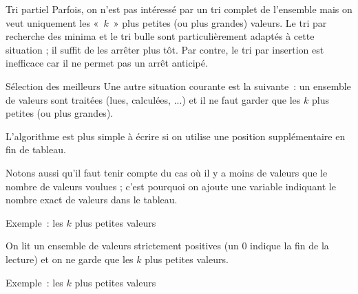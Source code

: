 \begin{frame}{Tri partiel}
	Parfois, on n’est pas intéressé par un tri complet de l’ensemble mais on
	veut uniquement les «~$k$~» plus petites (ou plus grandes) valeurs. Le
	tri par recherche des minima et le tri bulle sont particulièrement
	adaptés à cette situation ; il suffit de les arrêter plus tôt. Par
	contre, le tri par insertion est inefficace car il ne permet pas un
	arrêt anticipé.
\end{frame}

\begin{frame}{Sélection des meilleurs}
	Une autre situation courante est la suivante~: un ensemble de valeurs
	sont traitées (lues, calculées, ...) et il ne faut garder que les
	$k$ plus petites (ou plus grandes).
	
	L'algorithme est plus simple à écrire si on utilise
	une position supplémentaire en fin de tableau. 
	
	Notons aussi qu’il faut
	tenir compte du cas où il y a moins de valeurs que le nombre de valeurs
	voulues ; c’est pourquoi on ajoute une variable indiquant le nombre
	exact de valeurs dans le tableau.
\end{frame}

\begin{frame}{Exemple~: les $k$ plus petites valeurs}

		On lit un ensemble de valeurs strictement positives (un 0 indique la fin
		de la lecture) et on ne garde que les $k$ plus petites valeurs.

		\bigskip
		
\end{frame}

\begin{frame}{Exemple~: les $k$ plus petites valeurs}
\end{frame}

